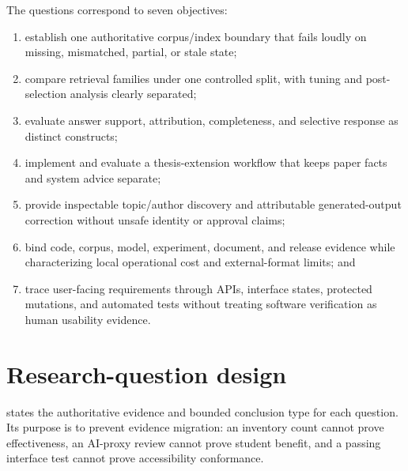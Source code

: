 The questions correspond to seven objectives:

\begin{enumerate}
  \item establish one authoritative corpus/index boundary that fails loudly on missing, mismatched, partial, or stale state;
  \item compare retrieval families under one controlled split, with tuning and post-selection analysis clearly separated;
  \item evaluate answer support, attribution, completeness, and selective response as distinct constructs;
  \item implement and evaluate a thesis-extension workflow that keeps paper facts and system advice separate;
  \item provide inspectable topic/author discovery and attributable generated-output correction without unsafe identity or approval claims;
  \item bind code, corpus, model, experiment, document, and release evidence while characterizing local operational cost and external-format limits; and
  \item trace user-facing requirements through APIs, interface states, protected mutations, and automated tests without treating software verification as human usability evidence.
\end{enumerate}

\section{Research-question design}

 states the authoritative evidence and bounded conclusion type for each question. Its purpose is to prevent evidence migration: an inventory count cannot prove effectiveness, an AI-proxy review cannot prove student benefit, and a passing interface test cannot prove accessibility conformance.

